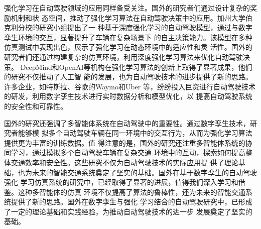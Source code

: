 强化学习在自动驾驶领域的应用同样备受关注。国外的研究者们通过设计复杂的奖励机制和状
态空间，推动了强化学习算法在自动驾驶决策中的应用。加州大学伯克利分校的研究小组提出了一
种基于深度强化学习的自动驾驶模型，通过与数字孪生环境的交互，显著提升了车辆在复杂场景下
的自主决策能力。该模型在多种仿真测试中表现出色，展示了强化学习在动态环境中的适应性和灵
活性。国外的研究者们还通过构建复杂的仿真环境，利用深度强化学习算法来优化自动驾驶决策。
DeepMind和OpenAI等机构在强化学习算法的创新上取得了显著成果，他们的研究不仅推动了人工智
能的发展，也为自动驾驶技术的进步提供了新的思路。许多企业，如特斯拉、谷歌的Waymo和Uber
等，纷纷投入巨资进行自动驾驶技术的研发，利用数字孪生技术进行实时数据分析和模型优化，以
提高自动驾驶系统的安全性和可靠性。

国外的研究还强调了多智能体系统在自动驾驶中的重要性。通过数字孪生技术，研究者能够模
拟多个自动驾驶车辆在同一环境中的交互行为，从而为强化学习算法提供更为丰富的训练数据。值
得注意的是，国外的研究还注重多智能体系统的协同学习，通过模拟多个自动驾驶车辆在复杂交通
环境中的互动，探索如何提高整体交通效率和安全性。这些研究不仅为自动驾驶技术的实际应用提
供了理论基础，也为未来的智能交通系统奠定了坚实的基础。国外在基于数字孪生的自动驾驶强化
学习仿真系统的研究中，已经取得了显著的进展，值得我们深入学习和借鉴。这种多智能体的仿真
环境不仅提高了算法的鲁棒性，还为未来的智能交通系统提供了新的思路。国外在数字孪生与强化
学习结合的自动驾驶研究中，已形成了一定的理论基础和实践经验，为推动自动驾驶技术的进一步
发展奠定了坚实的基础。





\begin{tabular}{l l}
\end{tabular}



